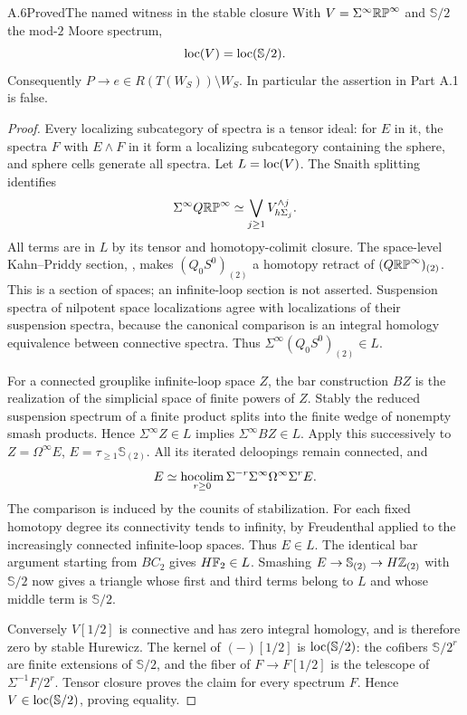 \begin{claim}{A.6}{Proved}{The named witness in the stable closure}\label{A6}
With $V=\Sigma^\infty\mathbb{RP}^\infty$ and $\mathbb S/2$ the mod-$2$ Moore spectrum,
\[
 \operatorname{loc}(V)=\operatorname{loc}(\mathbb S/2).
\]
Consequently $P\to e\in R(T(W_S))\setminus W_S$. In particular the assertion in Part A.1 is false.
\end{claim}
\begin{proof}
Every localizing subcategory of spectra is a tensor ideal: for $E$ in it, the spectra $F$ with $E\wedge F$ in it form a localizing subcategory containing the sphere, and sphere cells generate all spectra. Let $L=\operatorname{loc}(V)$. The Snaith splitting \cite[Theorem 1.1 and the filtration in Section 2]{ASnaith} identifies
\[
 \Sigma^\infty Q\mathbb{RP}^\infty\simeq
 \bigvee_{j\geq1}V^{\wedge j}_{h\Sigma_j}.
\]
All terms are in $L$ by its tensor and homotopy-colimit closure. The space-level Kahn--Priddy section, \cite[unnumbered main theorem, p.~103, and its construction on p.~110]{AKahnPriddy}, makes $(Q_0S^0)_{(2)}$ a homotopy retract of $(Q\mathbb{RP}^\infty)_{(2)}$. This is a section of spaces; an infinite-loop section is not asserted. Suspension spectra of nilpotent space localizations agree with localizations of their suspension spectra, because the canonical comparison is an integral homology equivalence between connective spectra. Thus $\Sigma^\infty(Q_0S^0)_{(2)}\in L$.

For a connected grouplike infinite-loop space $Z$, the bar construction $BZ$ is the realization of the simplicial space of finite powers of $Z$. Stably the reduced suspension spectrum of a finite product splits into the finite wedge of nonempty smash products. Hence $\Sigma^\infty Z\in L$ implies $\Sigma^\infty BZ\in L$. Apply this successively to $Z=\Omega^\infty E$, $E=\tau_{\geq1}\mathbb S_{(2)}$. All its iterated deloopings remain connected, and
\[
 E\simeq\operatorname*{hocolim}_{r\geq0}\Sigma^{-r}\Sigma^\infty\Omega^\infty\Sigma^rE.
\]
The comparison is induced by the counits of stabilization. For each fixed homotopy degree its connectivity tends to infinity, by Freudenthal applied to the increasingly connected infinite-loop spaces. Thus $E\in L$. The identical bar argument starting from $B C_2$ gives $H\mathbb F_2\in L$. Smashing $E\to\mathbb S_{(2)}\to H\mathbb Z_{(2)}$ with $\mathbb S/2$ now gives a triangle whose first and third terms belong to $L$ and whose middle term is $\mathbb S/2$.

Conversely $V[1/2]$ is connective and has zero integral homology, and is therefore zero by stable Hurewicz. The kernel of $(-)[1/2]$ is $\operatorname{loc}(\mathbb S/2)$: the cofibers $\mathbb S/2^r$ are finite extensions of $\mathbb S/2$, and the fiber of $F\to F[1/2]$ is the telescope of $\Sigma^{-1}F/2^r$. Tensor closure proves the claim for every spectrum $F$. Hence $V\in\operatorname{loc}(\mathbb S/2)$, proving equality.


\end{proof}
